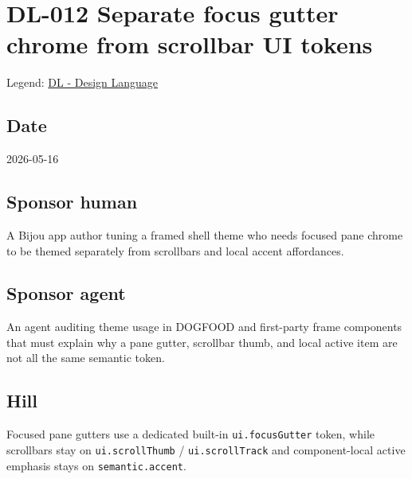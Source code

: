 \chapter{DL-012 Separate focus gutter chrome from scrollbar UI tokens}\label{record-177}

\smallskip

Legend: \href{https://github.com/flyingrobots/bijou/blob/1853ad902f6bf219326409e7f743a5a1d6517dbc/docs/legends/DL-design-language.md}{DL - Design Language}

\section{Date}\label{record-177-date}

2026-05-16

\section{Sponsor human}\label{record-177-sponsor-human}

A Bijou app author tuning a framed shell theme who needs focused pane chrome to be themed separately from scrollbars and local accent affordances.

\section{Sponsor agent}\label{record-177-sponsor-agent}

An agent auditing theme usage in DOGFOOD and first-party frame components that must explain why a pane gutter, scrollbar thumb, and local active item are not all the same semantic token.

\section{Hill}\label{record-177-hill}

Focused pane gutters use a dedicated built-in \texttt{u\allowbreak{}i\allowbreak{}.\allowbreak{}f\allowbreak{}o\allowbreak{}c\allowbreak{}u\allowbreak{}s\allowbreak{}G\allowbreak{}u\allowbreak{}t\allowbreak{}t\allowbreak{}e\allowbreak{}r} token, while scrollbars stay on \texttt{u\allowbreak{}i\allowbreak{}.\allowbreak{}s\allowbreak{}c\allowbreak{}r\allowbreak{}o\allowbreak{}l\allowbreak{}l\allowbreak{}T\allowbreak{}h\allowbreak{}u\allowbreak{}m\allowbreak{}b} / \texttt{u\allowbreak{}i\allowbreak{}.\allowbreak{}s\allowbreak{}c\allowbreak{}r\allowbreak{}o\allowbreak{}l\allowbreak{}l\allowbreak{}T\allowbreak{}r\allowbreak{}a\allowbreak{}c\allowbreak{}k} and component-local active emphasis stays on \texttt{s\allowbreak{}e\allowbreak{}m\allowbreak{}a\allowbreak{}n\allowbreak{}t\allowbreak{}i\allowbreak{}c\allowbreak{}.\allowbreak{}a\allowbreak{}c\allowbreak{}c\allowbreak{}e\allowbreak{}n\allowbreak{}t}.

